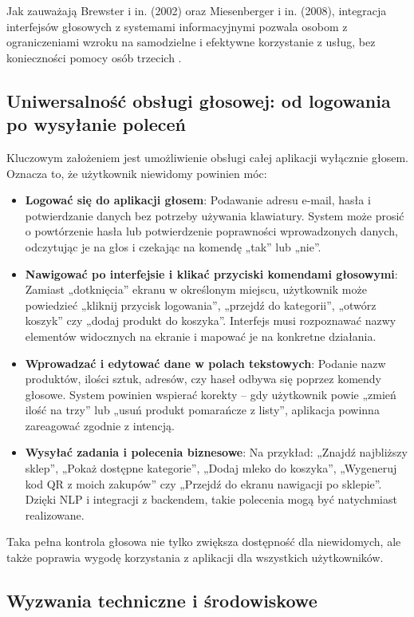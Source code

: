 Jak zauważają Brewster i in. (2002) oraz Miesenberger i in. (2008), integracja interfejsów głosowych z systemami informacyjnymi pozwala osobom z ograniczeniami wzroku na samodzielne i efektywne korzystanie z usług, bez konieczności pomocy osób trzecich \cite{Brewster2002,Miesenberger2008}.

\subsection{Uniwersalność obsługi głosowej: od logowania po wysyłanie poleceń}

Kluczowym założeniem jest umożliwienie obsługi całej aplikacji wyłącznie głosem. Oznacza to, że użytkownik niewidomy powinien móc:

\begin{itemize} \item \textbf{Logować się do aplikacji głosem}: Podawanie adresu e-mail, hasła i potwierdzanie danych bez potrzeby używania klawiatury. System może prosić o powtórzenie hasła lub potwierdzenie poprawności wprowadzonych danych, odczytując je na głos i czekając na komendę „tak” lub „nie”. \item \textbf{Nawigować po interfejsie i klikać przyciski komendami głosowymi}: Zamiast „dotknięcia” ekranu w określonym miejscu, użytkownik może powiedzieć „kliknij przycisk logowania”, „przejdź do kategorii”, „otwórz koszyk” czy „dodaj produkt do koszyka”. Interfejs musi rozpoznawać nazwy elementów widocznych na ekranie i mapować je na konkretne działania. \item \textbf{Wprowadzać i edytować dane w polach tekstowych}: Podanie nazw produktów, ilości sztuk, adresów, czy haseł odbywa się poprzez komendy głosowe. System powinien wspierać korekty – gdy użytkownik powie „zmień ilość na trzy” lub „usuń produkt pomarańcze z listy”, aplikacja powinna zareagować zgodnie z intencją. \item \textbf{Wysyłać zadania i polecenia biznesowe}: Na przykład: „Znajdź najbliższy sklep”, „Pokaż dostępne kategorie”, „Dodaj mleko do koszyka”, „Wygeneruj kod QR z moich zakupów” czy „Przejdź do ekranu nawigacji po sklepie”. Dzięki NLP i integracji z backendem, takie polecenia mogą być natychmiast realizowane. \end{itemize}

Taka pełna kontrola głosowa nie tylko zwiększa dostępność dla niewidomych, ale także poprawia wygodę korzystania z aplikacji dla wszystkich użytkowników.

\subsection{Wyzwania techniczne i środowiskowe}


